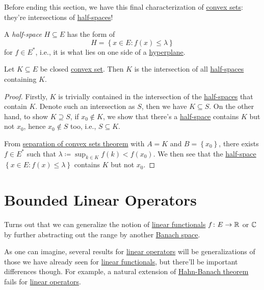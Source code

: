 Before ending this section, we have this final characterization of \hyperref[def:convex-set]{convex sets}: they're intersections of \hyperref[def:half-space]{half-spaces}!

\begin{definition}\label{def:half-space}
	A \emph{half-space} \(H \subseteq E\) has the form of
	\[
		H = \left\{ x\in E\colon f(x) \leq \lambda  \right\}
	\]
	for \(f\in E^{\ast} \), i.e., it is what lies on one side of a \hyperref[def:hyperplane]{hyperplane}.
\end{definition}

\begin{corollary}\label{col:lec10}
	Let \(K\subseteq E\) be closed \hyperref[def:convex-set]{convex set}. Then \(K\) is the intersection of all \hyperref[def:half-space]{half-spaces} containing \(K\).
\end{corollary}
\begin{proof}
	Firstly, \(K\) is trivially contained in the intersection of the \hyperref[def:half-space]{half-spaces} that contain \(K\). Denote such an intersection as \(S\), then we have \(K \subseteq S\). On the other hand, to show \(K \supseteq S\), if \(x_0 \notin K\), we show that there's a \hyperref[def:half-space]{half-space} contains \(K\) but not \(x_0\), hence \(x_0 \notin S\) too, i.e., \(S \subseteq K\).

	From \hyperref[thm:separation-of-convex-sets]{separation of convex sets theorem} with \(A = K\) and \(B = \left\{ x_0 \right\}\), there exists \(f\in E^{\ast} \) such that \(\lambda \coloneqq \sup _{k\in K}f(k) < f(x_0)\). We then see that the \hyperref[def:half-space]{half-space} \(\left\{ x\in E \colon f(x) \leq \lambda  \right\} \) contains \(K\) but not \(x_0\).
\end{proof}

\section{Bounded Linear Operators}
Turns out that we can generalize the notion of \hyperref[def:linear-functional]{linear functionals} \(f\colon E\to \mathbb{\MakeUppercase{r}} \) or \(\mathbb{\MakeUppercase{c}} \) by further abstracting out the range by another \hyperref[def:Banach-space]{Banach space}.

As one can imagine, several results for \hyperref[def:linear-op]{linear operators} will be generalizations of those we have already seen for \hyperref[def:linear-functional]{linear functionals}, but there'll be important differences though. For example, a natural extension of \hyperref[thm:Hahn-Banach]{Hahn-Banach theorem} fails for \hyperref[def:linear-op]{linear operators}.

